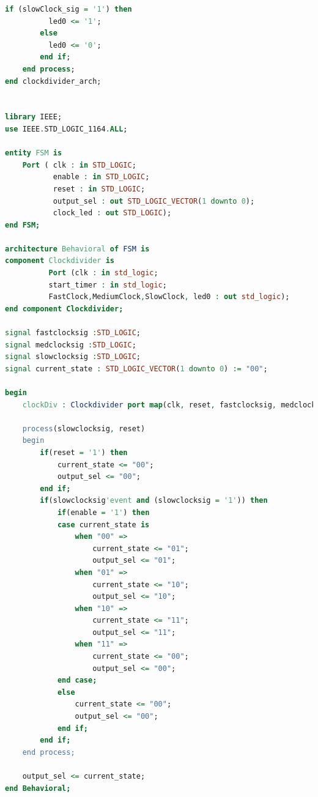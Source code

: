 \documentclass[11pt]{article}
\begin{document}
\begin{appendices}
\begin{lstlisting}[language=VHDL]
        if (slowClock_sig = '1') then
		  led0 <= '1';
	    else
		  led0 <= '0';
	    end if;
	end process;
end clockdivider_arch;


library IEEE;
use IEEE.STD_LOGIC_1164.ALL;

entity FSM is
    Port ( clk : in STD_LOGIC;
           enable : in STD_LOGIC;
           reset : in STD_LOGIC;
           output_sel : out STD_LOGIC_VECTOR(1 downto 0);
           clock_led : out STD_LOGIC);
end FSM;

architecture Behavioral of FSM is
component Clockdivider is 
          Port (clk : in std_logic;
          start_timer : in std_logic;
	      FastClock,MediumClock,SlowClock, led0 : out std_logic);
end component Clockdivider;

signal fastclocksig :STD_LOGIC;
signal medclocksig :STD_LOGIC;
signal slowclocksig :STD_LOGIC;
signal current_state : STD_LOGIC_VECTOR(1 downto 0) := "00";

begin
    clockDiv : Clockdivider port map(clk, reset, fastclocksig, medclocksig, slowclocksig, clock_led);
    
    process(slowclocksig, reset)
    begin
        if(reset = '1') then
            current_state <= "00";
            output_sel <= "00";
        end if;
        if(slowclocksig'event and (slowclocksig = '1')) then
            if(enable = '1') then
            case current_state is
                when "00" =>
                    current_state <= "01";
                    output_sel <= "01";
                when "01" =>
                    current_state <= "10";
                    output_sel <= "10";
                when "10" =>
                    current_state <= "11";
                    output_sel <= "11";
                when "11" =>
                    current_state <= "00";
                    output_sel <= "00";
            end case;
            else
                current_state <= "00";
                output_sel <= "00";
            end if;
        end if;
    end process;
    
    output_sel <= current_state;
end Behavioral;
\end{lstlisting}


\end{appendices}
\end{document}
